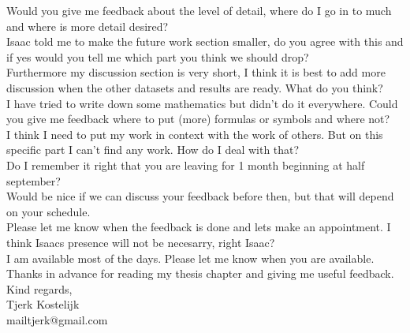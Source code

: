 Would you give me feedback about the level of detail, where do I go in to much and where is more detail desired?\\
Isaac told me to make the future work section smaller, do you agree with this and if yes would you tell me which part you think we should drop?\\
Furthermore my discussion section is very short, I think it is best to add more discussion when the other datasets and results are ready. What do you think?\\
I have tried to write down some mathematics but didn't do it everywhere. Could you give me feedback where to put (more) formulas or symbols and where not?\\
I think I need to put my work in context with the work of others. But on this specific part I can't find any work. How do I deal with that?\\
Do I remember it right that you are leaving for 1 month beginning at half september?\\
Would be nice if we can discuss your feedback before then, but that will depend on your schedule.\\
Please let me know when the feedback is done and lets make an appointment. I think Isaacs presence will not be necesarry, right Isaac?\\
I am available most of the days. Please let me know when you are available.\\

Thanks in advance for reading my thesis chapter and giving me useful feedback.\\

Kind regards,\\
Tjerk Kostelijk\\
mailtjerk@gmail.com
